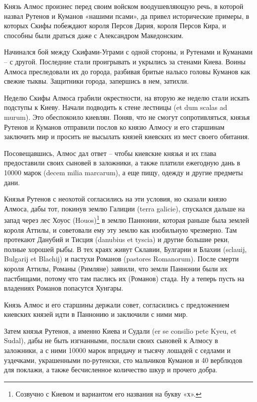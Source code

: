 Князь Алмос произнес перед своим войском воодушевляющую речь, в которой назвал Рутенов и Куманов «нашими псами», да привел исторические примеры, в которых Скифы побеждают короля Персов Дария, короля Персов Кира, и способны были драться даже с Александром Македонским.

Начинался бой между Скифами-Уграми с одной стороны, и Рутенами и Куманами – с другой. Последние стали проигрывать и укрылись за стенами Киева. Воины Алмоса преследовали их до города, разбивая бритые налысо головы Куманов как свежие тыквы. Защитники города, запершись в нем, затихли.

Неделю Скифы Алмоса грабили окрестности, на вторую же неделю стали искать подступы к Киеву. Начали подводить к стене лестницы (et dum scalas ad murum). Это обеспокоило киевлян. Поняв, что не смогут сопротивляться, князья Рутенов и Куманов отправили послов ко князю Алмосу и его старшинам заключить мир и просить не высылать князей киевских из мест своего обитания. 

Посовещавшись, Алмос дал ответ – чтобы киевские князья и их глава предоставили своих сыновей в заложники, а также платили ежегодную дань в 10000 марок (decem milia marcarum), а еще пищу, одежду и другие предметы дани.

Князья Рутенов с неохотой согласились на эти условия, но сказали князю Алмоса, дабы тот, покинув землю Галиции (terra galicie), спускался дальше на запад через лес Хоуос (Houos)\footnote{Созвучно с Киевом и вариантом его названия на букву «х».} в землю Паннонии, которая раньше была землей короля Аттилы, и советовали ему эту землю как изобильную чрезмерно. Там протекают Данубий и Тисция (danubius et tyscia) и другие большие реки, полные хорошей рыбы. В тех краях живут Склавии, Булгарии и Блахии (sclauij, Bulgarij et Blachij) и пастухи Романов (pastores Romanorum). После смерти короля Аттилы, Романы (Римляне) заявили, что земли Паннонии были их пастбищами, потому что там паслись их (Романов) стада. Ну а теперь пусть на владениях Романов попасутся Хунгары. 

Князь Алмос и его старшины держали совет,  согласились с предложением киевских князей идти в Паннонию и заключили с ними мир.

Затем князья Рутенов, а именно Киева и Судали (er se consilio pete Kyeu, et Sudal), дабы не быть изгнанными, послали своих сыновей к Алмосу в заложники, а с ними 10000 марок впридачу и тысячу лошадей с седлами и уздечками, украшенными по-рутенски, сто мальчиков Куманов и 40 верблюдов для поклажи, а также бесчисленное количество шкур и прочего добра.


